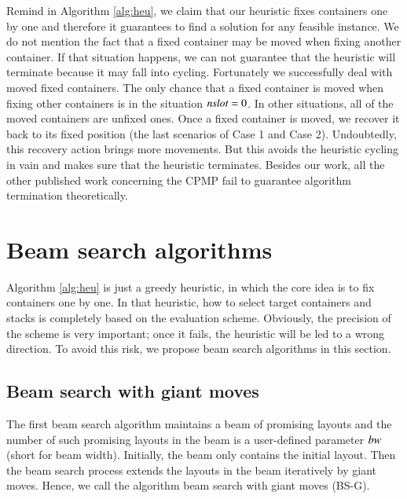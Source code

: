 \documentclass[review,3p,times,authoryear,12pt]{elsarticle}
\begin{document}
Remind in Algorithm \ref{alg:heu}, we claim that our heuristic fixes containers one by one and therefore it guarantees to find a solution for any feasible instance. We do not mention the fact that a fixed container may be moved when fixing another container.
If that situation happens, we can not guarantee that the heuristic will terminate because it may fall into cycling. Fortunately we successfully deal with moved fixed containers. The only chance that a fixed container is moved when fixing other containers is in the situation $\id{nslot}=0$.
In other situations, all of the moved containers are unfixed ones. Once a fixed container is moved, we recover it back to its fixed position (the last scenarios of Case 1 and Case 2).
Undoubtedly, this recovery action brings more movements. But this avoids the heuristic cycling in vain and makes sure that the heuristic terminates.
Besides our work, all the other published work concerning the CPMP fail to guarantee algorithm termination theoretically.

\section{Beam search algorithms}
\label{sec:g2la}

Algorithm \ref{alg:heu} is just a greedy heuristic, in which the core idea is to fix containers one by one. In that heuristic, how to select target containers and stacks is completely based on the evaluation scheme.
Obviously, the precision of the scheme is very important; once it fails, the heuristic will be led to a wrong direction. To avoid this risk, we propose beam search algorithms in this section.

\subsection{Beam search with giant moves}

The first beam search algorithm maintains a beam of promising layouts and the number of such promising layouts in the beam is a user-defined parameter $\id{bw}$ (short for beam width). Initially, the beam only contains the initial layout. Then the beam search process extends the layouts in the beam iteratively by giant moves. Hence, we call the algorithm beam search with giant moves (BS-G).
\end{document}
